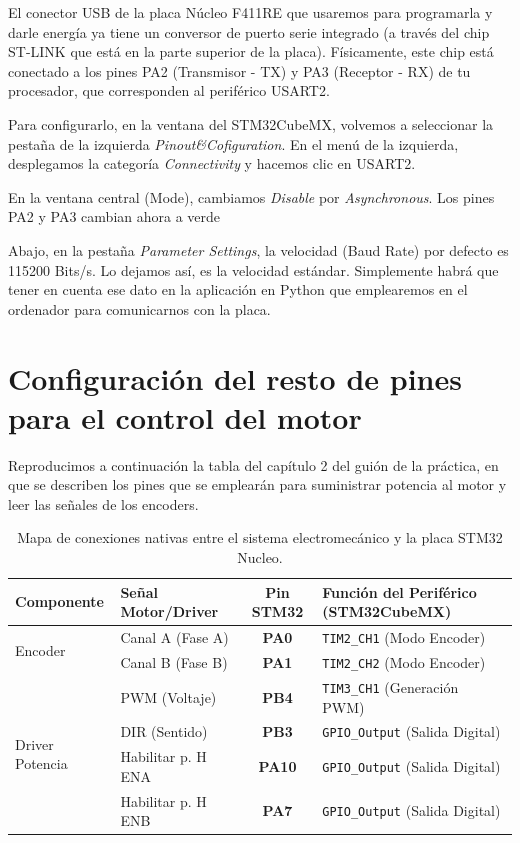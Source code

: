 \documentclass[10pt,a4paper]{report}
\begin{document}
El conector USB de la placa Núcleo F411RE que usaremos para programarla y darle energía ya tiene un conversor de puerto serie integrado (a través del chip ST-LINK que está en la parte superior de la placa). Físicamente, este chip está conectado a los pines PA2 (Transmisor - TX) y PA3 (Receptor - RX) de tu procesador, que corresponden al periférico USART2.

Para configurarlo, en la ventana del STM32CubeMX, volvemos a seleccionar la pestaña de la izquierda \emph{Pinout\&Cofiguration}. En el menú de la izquierda, desplegamos la categoría \emph{Connectivity} y hacemos clic en USART2.

En la ventana central (Mode), cambiamos \emph{Disable} por \emph{Asynchronous}. Los pines PA2 y PA3 cambian ahora a verde

Abajo, en la pestaña \emph{Parameter Settings}, la velocidad (Baud Rate) por defecto es 115200 Bits/s. Lo dejamos así, es la velocidad estándar. Simplemente habrá que tener en cuenta ese dato en la aplicación en Python que emplearemos en el ordenador para comunicarnos con la placa.



\section{Configuración del resto de pines para el control del motor}
Reproducimos a continuación la tabla del capítulo 2 del guión de la práctica, en que se describen los pines que se emplearán para suministrar potencia al motor y leer las señales de los encoders.

\begin{table}[h]
	\centering
	\begin{tabular}{|l|l|c|p{7.5cm}|}
		\hline
		\textbf{Componente} & \textbf{Señal Motor/Driver} & \textbf{Pin STM32} & \textbf{Función del Periférico (STM32CubeMX)} \\ \hline
		\multirow{2}{*}{Encoder} 
		& Canal A (Fase A) & \textbf{PA0} & \texttt{TIM2\_CH1} (Modo Encoder) \\ \cline{2-4} 
		& Canal B (Fase B) & \textbf{PA1} & \texttt{TIM2\_CH2} (Modo Encoder) \\ \hline
		\multirow{4}{*}{Driver Potencia} 
		& PWM (Voltaje) & \textbf{PB4} & \texttt{TIM3\_CH1} (Generación PWM) \\ \cline{2-4} 
		& DIR (Sentido)   & \textbf{PB3} & \texttt{GPIO\_Output} (Salida Digital) \\ \cline{2-4} 
		&Habilitar p. H ENA & \textbf{PA10} & \texttt{GPIO\_Output} (Salida Digital) \\ \cline{2-4} 
		&Habilitar p. H ENB & \textbf{PA7} & \texttt{GPIO\_Output} (Salida Digital) \\
		\hline
	\end{tabular}
	\caption{Mapa de conexiones nativas entre el sistema electromecánico y la placa STM32 Nucleo.}
	\label{tab:pines}
\end{table}
\end{document}
